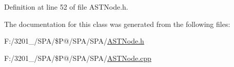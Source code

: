 Definition at line 52 of file A\-S\-T\-Node.\-h.



The documentation for this class was generated from the following files\-:\begin{DoxyCompactItemize}
\item 
F\-:/3201\-\_/\-S\-P\-A/\$\-P@/\-S\-P\-A/\-S\-P\-A/\hyperlink{_a_s_t_node_8h}{A\-S\-T\-Node.\-h}\item 
F\-:/3201\-\_/\-S\-P\-A/\$\-P@/\-S\-P\-A/\-S\-P\-A/\hyperlink{_a_s_t_node_8cpp}{A\-S\-T\-Node.\-cpp}\end{DoxyCompactItemize}

